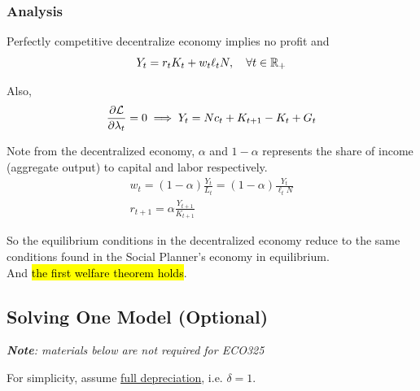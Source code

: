 \documentclass[11pt]{article}
\begin{document}
		\subsubsection{Analysis}
			\begin{remark}
				Perfectly competitive decentralize economy implies no profit and
				\[
					Y_t = r_t K_t + w_t \ell_t N,\quad \forall t \in \mathbb{R}_+
				\]
			\end{remark}
			Also,
			\begin{gather}
				\frac{\partial{\mathcal{{L}}}}{\partial{\lambda_t}} = 0 
				\implies Y_t = Nc_t + K_{t+1} - K_t + G_t
			\end{gather}
			
			\par Note from the decentralized economy, $\alpha$ and $1 - \alpha$ represents the share of income (aggregate output) to capital and labor respectively.
			\begin{gather}
				w_t = (1-\alpha)\frac{Y_t}{L_t} = (1-\alpha) \frac{Y_t}{\ell_t N} \\
				r_{t+1} = \alpha \frac{Y_{t+1}}{K_{t+1}}
			\end{gather}
			\par So the equilibrium conditions  in the decentralized economy reduce to the same conditions found in the Social Planner's economy in equilibrium. \\
			And \hl{the first welfare theorem holds}.
			
		\subsection{Solving One Model (Optional)}
		\emph{\textbf{Note}: materials below are not required for ECO325}
		\begin{assumption}
			For simplicity, assume \ul{full depreciation}, i.e. $\delta = 1$.
		\end{assumption}
\end{document}
